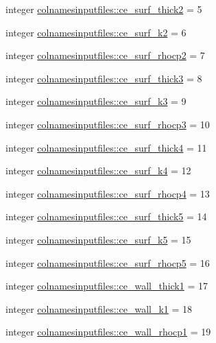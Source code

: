 \begin{DoxyCompactItemize}
\item 
integer \hyperlink{namespacecolnamesinputfiles_adaa231ca48757a635b47d5486a5b755c}{colnamesinputfiles\+::ce\+\_\+surf\+\_\+thick2} = 5
\item 
integer \hyperlink{namespacecolnamesinputfiles_ad10ebeecf8dc5db61a34743fab8f32c7}{colnamesinputfiles\+::ce\+\_\+surf\+\_\+k2} = 6
\item 
integer \hyperlink{namespacecolnamesinputfiles_a0f5afdb74317344d39f3dd416f1248c0}{colnamesinputfiles\+::ce\+\_\+surf\+\_\+rhocp2} = 7
\item 
integer \hyperlink{namespacecolnamesinputfiles_a9cb2fcbad1aaf1ade909fb24cd396c32}{colnamesinputfiles\+::ce\+\_\+surf\+\_\+thick3} = 8
\item 
integer \hyperlink{namespacecolnamesinputfiles_a623769edc0d32bef8eab4a0025402f28}{colnamesinputfiles\+::ce\+\_\+surf\+\_\+k3} = 9
\item 
integer \hyperlink{namespacecolnamesinputfiles_a9c670c6cf85f64e4c5b61a0209cacb30}{colnamesinputfiles\+::ce\+\_\+surf\+\_\+rhocp3} = 10
\item 
integer \hyperlink{namespacecolnamesinputfiles_acbb118b6dc2c3dc14466f731864bee59}{colnamesinputfiles\+::ce\+\_\+surf\+\_\+thick4} = 11
\item 
integer \hyperlink{namespacecolnamesinputfiles_a93e5f09a71dccea7f06face041ff36b4}{colnamesinputfiles\+::ce\+\_\+surf\+\_\+k4} = 12
\item 
integer \hyperlink{namespacecolnamesinputfiles_a4f0e75fde03b6e6bff1b827c31e1c5bb}{colnamesinputfiles\+::ce\+\_\+surf\+\_\+rhocp4} = 13
\item 
integer \hyperlink{namespacecolnamesinputfiles_a4f79d61f519bb49ecc390e2c0f49b191}{colnamesinputfiles\+::ce\+\_\+surf\+\_\+thick5} = 14
\item 
integer \hyperlink{namespacecolnamesinputfiles_adeeb66b92b53599afbf7da1794c9430b}{colnamesinputfiles\+::ce\+\_\+surf\+\_\+k5} = 15
\item 
integer \hyperlink{namespacecolnamesinputfiles_a75aa30718f45e14f8d00c610f774f855}{colnamesinputfiles\+::ce\+\_\+surf\+\_\+rhocp5} = 16
\item 
integer \hyperlink{namespacecolnamesinputfiles_a9a74b41366de2662467abd8bc37dc81a}{colnamesinputfiles\+::ce\+\_\+wall\+\_\+thick1} = 17
\item 
integer \hyperlink{namespacecolnamesinputfiles_a3679e3ae276d6f4c22a89150d9f41a94}{colnamesinputfiles\+::ce\+\_\+wall\+\_\+k1} = 18
\item 
integer \hyperlink{namespacecolnamesinputfiles_a82e9323d2bc27d098e0411095b87a4fc}{colnamesinputfiles\+::ce\+\_\+wall\+\_\+rhocp1} = 19

\end{DoxyCompactItemize}
